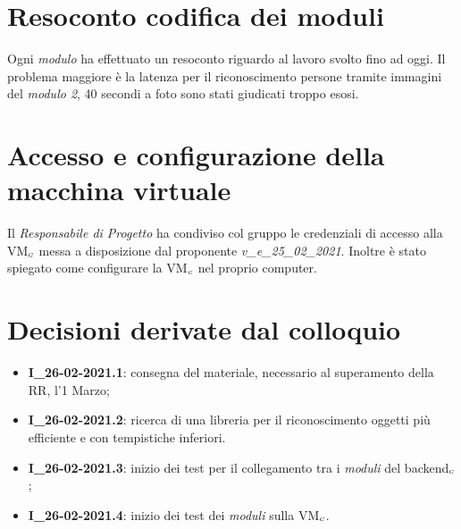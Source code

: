 \section{Resoconto codifica dei moduli}
Ogni \textit{modulo} ha effettuato un resoconto riguardo al lavoro svolto fino ad oggi.
Il problema maggiore è la latenza per il riconoscimento persone tramite immagini del \textit{modulo 2}, 40 secondi a foto sono stati giudicati troppo esosi.


\section{Accesso e configurazione della macchina virtuale}
Il \textit{Responsabile di Progetto} ha condiviso col gruppo le credenziali di accesso alla VM$_{\scaleto{G}{3pt}}$ messa a disposizione dal proponente \textit{v\_e\_25\_02\_2021}.
Inoltre è stato spiegato come configurare la VM$_{\scaleto{G}{3pt}}$ nel proprio computer.

\section{Decisioni derivate dal colloquio}
  \begin{itemize}
    \item \textbf{I\_26-02-2021.1}: consegna del materiale, necessario al superamento della RR, l'1 Marzo;
    \item \textbf{I\_26-02-2021.2}: ricerca di una libreria per il riconoscimento oggetti più efficiente e con tempistiche inferiori.
    \item \textbf{I\_26-02-2021.3}: inizio dei test per il collegamento tra i \textit{moduli} del backend$_{\scaleto{G}{3pt}}$;
    \item \textbf{I\_26-02-2021.4}: inizio dei test dei \textit{moduli} sulla VM$_{\scaleto{G}{3pt}}$.
  \end{itemize}
